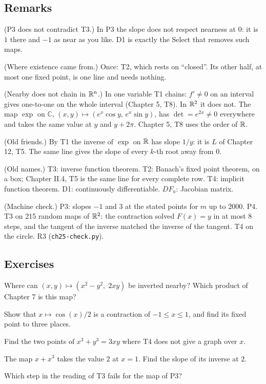 \subsection*{Remarks}

\begin{lines}
\item[\lab{R1}] (P3 does not contradict T3.) In P3 the slope does not respect nearness at $0$: it is $1$ there and $-1$ as near as you like. D1 is exactly the Select that removes such maps.
\item[\lab{R2}] (Where existence came from.) Once: T2, which rests on ``closed''. Its other half, at most one fixed point, is one line and needs nothing.
\item[\lab{R3}] (Nearby does not chain in $\mathbb{R}^n$.) In one variable T1 chains: $f' \neq 0$ on an interval gives one-to-one on the whole interval (Chapter 5, T8). In $\mathbb{R}^2$ it does not. The map $\exp$ on $\mathbb{C}$, $(x, y) \mapsto (e^x \cos y,\, e^x \sin y)$, has $\det = e^{2x} \neq 0$ everywhere and takes the same value at $y$ and $y + 2\pi$. Chapter 5, T8 uses the order of $\mathbb{R}$.
\item[\lab{R4}] (Old friends.) By T1 the inverse of $\exp$ on $\mathbb{R}$ has slope $1/y$: it is $L$ of Chapter 12, T5. The same line gives the slope of every $k$-th root away from $0$.
\item[\lab{R5}] (Old names.) T3: inverse function theorem. T2: Banach's fixed point theorem, on a box; Chapter II.4, T5 is the same line for every complete row. T4: implicit function theorem. D1: continuously differentiable. $DF_a$: Jacobian matrix.
\item[\lab{R6}] (Machine check.) P3: slopes $-1$ and $3$ at the stated points for $m$ up to 2000. P4. T3 on 215 random maps of $\mathbb{R}^2$: the contraction solved $F(x) = y$ in at most 8 steps, and the tangent of the inverse matched the inverse of the tangent. T4 on the circle. R3 (\texttt{ch25-check.py}).
\end{lines}

\subsection*{Exercises}

\begin{lines}
\item[\lab{E1}] Where can $(x, y) \mapsto (x^2 - y^2,\; 2xy)$ be inverted nearby? Which product of Chapter 7 is this map?
\item[\lab{E2}] Show that $x \mapsto \cos(x)/2$ is a contraction of $-1 \le x \le 1$, and find its fixed point to three places.
\item[\lab{E3}] Find the two points of $x^3 + y^3 = 3xy$ where T4 does not give a graph over $x$.
\item[\lab{E4}] The map $x + x^3$ takes the value $2$ at $x = 1$. Find the slope of its inverse at $2$.
\item[\lab{E5}] Which step in the reading of T3 fails for the map of P3?
\end{lines}

